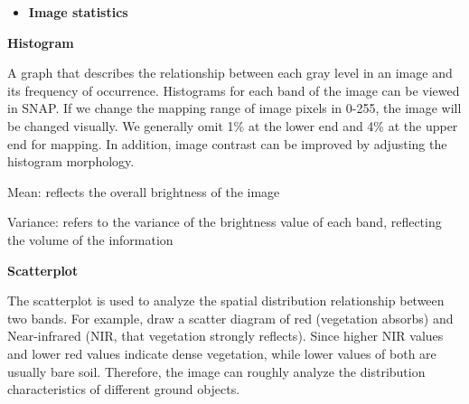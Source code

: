 \documentclass[
  letterpaper,
  DIV=11,
  numbers=noendperiod]{scrreprt}
\providecommand{\tightlist}{%
  \setlength{\itemsep}{0pt}\setlength{\parskip}{0pt}}\usepackage{longtable,booktabs,array}
\begin{document}
\begin{itemize}
\tightlist
\item
  \textbf{Image statistics}
\end{itemize}

\textbf{Histogram}

A graph that describes the relationship between each gray level in an
image and its frequency of occurrence. Histograms for each band of the
image can be viewed in SNAP. If we change the mapping range of image
pixels in 0-255, the image will be changed visually. We generally omit
1\% at the lower end and 4\% at the upper end for mapping. In addition,
image contrast can be improved by adjusting the histogram morphology.

\begin{tcolorbox}[enhanced jigsaw, title=\textcolor{quarto-callout-note-color}{\faInfo}\hspace{0.5em}{Note}, coltitle=black, opacitybacktitle=0.6, toprule=.15mm, leftrule=.75mm, opacityback=0, arc=.35mm, breakable, colbacktitle=quarto-callout-note-color!10!white, colback=white, bottomrule=.15mm, bottomtitle=1mm, toptitle=1mm, titlerule=0mm, rightrule=.15mm, left=2mm, colframe=quarto-callout-note-color-frame]
Mean: reflects the overall brightness of the image

Variance: refers to the variance of the brightness value of each band,
reflecting the volume of the information
\end{tcolorbox}

\textbf{Scatterplot}

The scatterplot is used to analyze the spatial distribution relationship
between two bands. For example, draw a scatter diagram of red
(vegetation absorbs) and Near-infrared (NIR, that vegetation strongly
reflects). Since higher NIR values and lower red values indicate dense
vegetation, while lower values of both are usually bare soil. Therefore,
the image can roughly analyze the distribution characteristics of
different ground objects.
\end{document}
